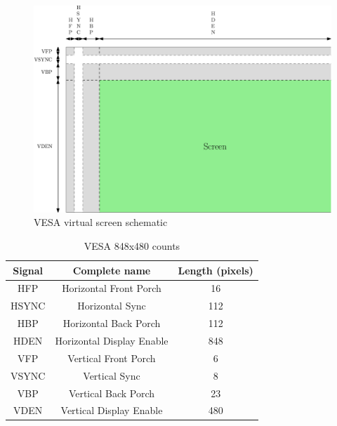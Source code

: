 \begin{figure}[H]
    \centering
    \includegraphics[width=\linewidth]{Chapter4-GPU_CLKU/res/screen_vesa}
    \caption{VESA virtual screen schematic}
    \label{fig:gpu/screen_vesa}
\end{figure}

\begin{table}[H]
    \centering
    \begin{tabular}{|c|c|c|}
    \hline
    \rowcolor[HTML]{DAE8FC} 
    \textbf{Signal} & \textbf{Complete name}    & \multicolumn{1}{l|}{\cellcolor[HTML]{DAE8FC}\textbf{Length (pixels)}} \\ \hline
    HFP             & Horizontal Front Porch    & 16                                                                    \\ \hline
    HSYNC           & Horizontal Sync           & 112                                                                   \\ \hline
    HBP             & Horizontal Back Porch     & 112                                                                   \\ \hline
    HDEN            & Horizontal Display Enable & 848                                                                   \\ \hline
    VFP             & Vertical Front Porch      & 6                                                                     \\ \hline
    VSYNC           & Vertical Sync             & 8                                                                     \\ \hline
    VBP             & Vertical Back Porch       & 23                                                                    \\ \hline
    VDEN            & Vertical Display Enable   & 480                                                                   \\ \hline
    \end{tabular}
    \caption{VESA 848x480 counts}
    \label{tab:gpu/vesa}
\end{table}

